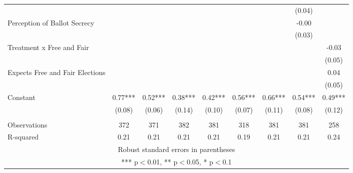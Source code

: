 \begin{tabular}{lcccccccc}
 &  &  &  &  &  &  & (0.04) &  \\
Perception of Ballot Secrecy &  &  &  &  &  &  & -0.00 &  \\
 &  &  &  &  &  &  & (0.03) &  \\
Treatment x Free and Fair &  &  &  &  &  &  &  & -0.03 \\
 &  &  &  &  &  &  &  & (0.05) \\
Expects Free and Fair Elections &  &  &  &  &  &  &  & 0.04 \\
 &  &  &  &  &  &  &  & (0.05) \\
Constant & 0.77*** & 0.52*** & 0.38*** & 0.42*** & 0.56*** & 0.66*** & 0.54*** & 0.49*** \\
 & (0.08) & (0.06) & (0.14) & (0.10) & (0.07) & (0.11) & (0.08) & (0.12) \\
 &  &  &  &  &  &  &  &  \\
Observations & 372 & 371 & 382 & 381 & 318 & 381 & 381 & 258 \\
 R-squared & 0.21 & 0.21 & 0.21 & 0.21 & 0.19 & 0.21 & 0.21 & 0.24 \\ \hline
\multicolumn{9}{c}{ Robust standard errors in parentheses} \\
\multicolumn{9}{c}{ *** p$<$0.01, ** p$<$0.05, * p$<$0.1} \\
\end{tabular}
